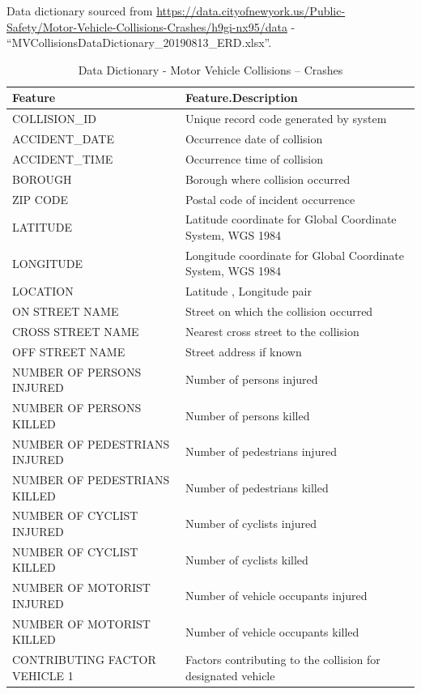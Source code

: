 Data dictionary sourced from
\url{https://data.cityofnewyork.us/Public-Safety/Motor-Vehicle-Collisions-Crashes/h9gi-nx95/data}
- ``MVCollisionsDataDictionary\_20190813\_ERD.xlsx''.

\begin{table}

\caption{\label{tab:data-dictionary}Data Dictionary - Motor Vehicle Collisions – Crashes}
\centering
\begin{tabular}[t]{l|l}
\hline
Feature & Feature.Description\\
\hline
COLLISION\_ID & Unique record code generated by system\\
\hline
ACCIDENT\_DATE & Occurrence date of collision\\
\hline
ACCIDENT\_TIME & Occurrence time of collision\\
\hline
BOROUGH & Borough where collision occurred\\
\hline
ZIP CODE & Postal code of incident occurrence\\
\hline
LATITUDE & Latitude coordinate for Global Coordinate System, WGS 1984\\
\hline
LONGITUDE & Longitude coordinate for Global Coordinate System, WGS 1984\\
\hline
LOCATION & Latitude , Longitude pair\\
\hline
ON STREET NAME & Street on which the collision occurred\\
\hline
CROSS STREET NAME & Nearest cross street to the collision\\
\hline
OFF STREET NAME & Street address if known\\
\hline
NUMBER OF PERSONS INJURED & Number of persons injured\\
\hline
NUMBER OF PERSONS KILLED & Number of persons killed\\
\hline
NUMBER OF PEDESTRIANS INJURED & Number of pedestrians injured\\
\hline
NUMBER OF PEDESTRIANS KILLED & Number of pedestrians killed\\
\hline
NUMBER OF CYCLIST INJURED & Number of cyclists injured\\
\hline
NUMBER OF CYCLIST KILLED & Number of cyclists killed\\
\hline
NUMBER OF MOTORIST INJURED & Number of vehicle occupants injured\\
\hline
NUMBER OF MOTORIST KILLED & Number of vehicle occupants killed\\
\hline
CONTRIBUTING FACTOR VEHICLE 1 & Factors contributing to the collision for designated vehicle\\

\end{tabular}
\end{table}
